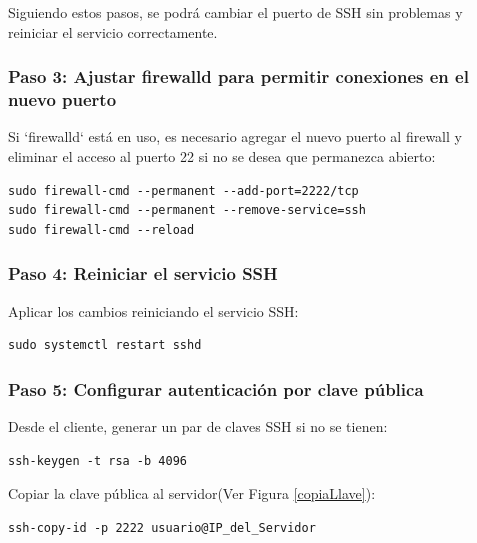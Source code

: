 Siguiendo estos pasos, se podrá cambiar el puerto de SSH sin problemas y reiniciar el servicio correctamente.


\subsubsection*{Paso 3: Ajustar firewalld para permitir conexiones en el nuevo puerto}

Si `firewalld` está en uso, es necesario agregar el nuevo puerto al firewall y eliminar el acceso al puerto 22 si no se desea que permanezca abierto:

\begin{lstlisting}[style=mystyle]
sudo firewall-cmd --permanent --add-port=2222/tcp
sudo firewall-cmd --permanent --remove-service=ssh
sudo firewall-cmd --reload
\end{lstlisting}

\subsubsection*{Paso 4: Reiniciar el servicio SSH}

Aplicar los cambios reiniciando el servicio SSH:

\begin{lstlisting}[style=mystyle]
sudo systemctl restart sshd
\end{lstlisting}

\subsubsection*{Paso 5: Configurar autenticación por clave pública}

Desde el cliente, generar un par de claves SSH si no se tienen:

\begin{lstlisting}[style=mystyle]
ssh-keygen -t rsa -b 4096
\end{lstlisting}

Copiar la clave pública al servidor(Ver Figura \ref{copiaLlave}):

\begin{lstlisting}[style=mystyle]
ssh-copy-id -p 2222 usuario@IP_del_Servidor
\end{lstlisting}


